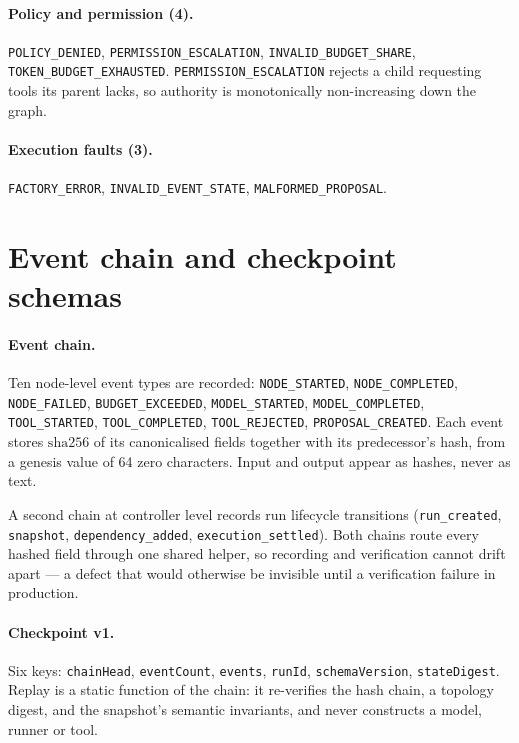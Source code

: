 \documentclass[10pt]{article}
\begin{document}
\paragraph{Policy and permission (4).}
\texttt{POLICY\_DENIED}, \texttt{PERMISSION\_ESCALATION},
\texttt{INVALID\_BUDGET\_SHARE}, \texttt{TOKEN\_BUDGET\_EXHAUSTED}.
\texttt{PERMISSION\_ESCALATION} rejects a child requesting tools its parent
lacks, so authority is monotonically non-increasing down the graph.

\paragraph{Execution faults (3).}
\texttt{FACTORY\_ERROR}, \texttt{INVALID\_EVENT\_STATE},
\texttt{MALFORMED\_PROPOSAL}.

\section{Event chain and checkpoint schemas}
\label{app:schemas}

\paragraph{Event chain.}
Ten node-level event types are recorded: \texttt{NODE\_STARTED},
\texttt{NODE\_COMPLETED}, \texttt{NODE\_FAILED}, \texttt{BUDGET\_EXCEEDED},
\texttt{MODEL\_STARTED}, \texttt{MODEL\_COMPLETED}, \texttt{TOOL\_STARTED},
\texttt{TOOL\_COMPLETED}, \texttt{TOOL\_REJECTED},
\texttt{PROPOSAL\_CREATED}. Each event stores
$\mathrm{sha256}$ of its canonicalised fields together with its predecessor's
hash, from a genesis value of 64 zero characters. Input and output appear as
hashes, never as text.

A second chain at controller level records run lifecycle transitions
(\texttt{run\_created}, \texttt{snapshot}, \texttt{dependency\_added},
\texttt{execution\_settled}). Both chains route every hashed field through one
shared helper, so recording and verification cannot drift apart --- a defect
that would otherwise be invisible until a verification failure in production.

\paragraph{Checkpoint v1.}
Six keys: \texttt{chainHead}, \texttt{eventCount}, \texttt{events},
\texttt{runId}, \texttt{schemaVersion}, \texttt{stateDigest}. Replay is a static
function of the chain: it re-verifies the hash chain, a topology digest, and the
snapshot's semantic invariants, and never constructs a model, runner or tool.
\end{document}
